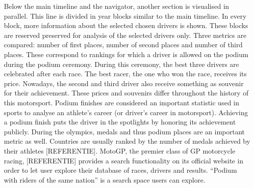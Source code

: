 \documentclass{sigchi}
\begin{document}
Below the main timeline and the navigator, another section is visualised in parallel. This line is divided in year blocks similar to the main timeline. In every block, more information about the selected chosen drivers is shown. These blocks are reserved preserved for analysis of the selected drivers only. Three metrics are compared: number of first places, number of second places and number of third places. These correspond to rankings for which a driver is allowed on the podium during the podium ceremony. During this ceremony, the best three drivers are celebrated after each race. The best racer, the one who won the race, receives its price. Nowadays, the second and third driver also receive something as souvenir for their achievement. These prices and souvenirs differ throughout the history of this motorsport.  Podium finishes are considered an important statistic used in sports to analyse an athlete's career (or driver's career in motorsport). Achieving a podium finish puts the driver in the spotlights by honoring its achievement publicly. During the olympics, medals and thus podium places are an important metric as well. Countries are usually ranked by the number of medals achieved by their athletes [REFERENTIE]. MotoGP, the premier class of GP motorcycle racing, [REFERENTIE] provides a search functionality on its official website in order to let user explore their database of races, drivers and results. ``Podium with riders of the same nation'' is a search space users can explore.
\end{document}
